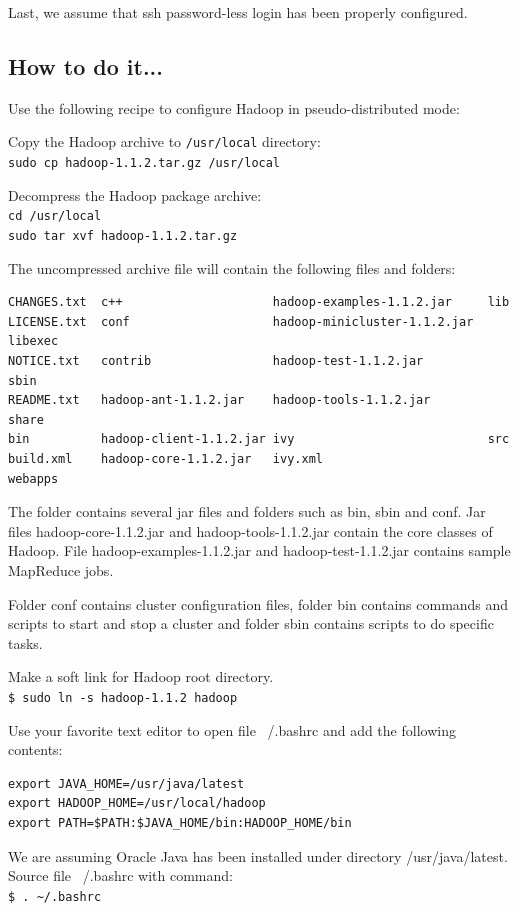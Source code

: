 Last, we assume that ssh password-less login has been properly configured.
\subsection*{How to do it...}
Use the following recipe to configure Hadoop in pseudo-distributed mode:

Copy the Hadoop archive to \verb|/usr/local| directory:\\
\verb|sudo cp hadoop-1.1.2.tar.gz /usr/local|

Decompress the Hadoop package archive: \\
\verb|cd /usr/local| \\
\verb|sudo tar xvf hadoop-1.1.2.tar.gz|

The uncompressed archive file will contain the following files and folders:
\lstset{style=bashstyle}
\begin{lstlisting}[caption=Content from the uncompressed Hadoop package.]
CHANGES.txt  c++                     hadoop-examples-1.1.2.jar     lib
LICENSE.txt  conf                    hadoop-minicluster-1.1.2.jar  libexec
NOTICE.txt   contrib                 hadoop-test-1.1.2.jar         sbin
README.txt   hadoop-ant-1.1.2.jar    hadoop-tools-1.1.2.jar        share
bin          hadoop-client-1.1.2.jar ivy                           src
build.xml    hadoop-core-1.1.2.jar   ivy.xml                       webapps
\end{lstlisting}
The folder contains several jar files and folders such as bin, sbin and conf. Jar files hadoop-core-1.1.2.jar and hadoop-tools-1.1.2.jar contain the core classes of Hadoop. File hadoop-examples-1.1.2.jar and hadoop-test-1.1.2.jar contains sample MapReduce jobs.

Folder conf contains cluster configuration files, folder bin contains commands and scripts to start and stop a cluster and folder sbin contains scripts to do specific tasks.

Make a soft link for Hadoop root directory. \\
\verb|$ sudo ln -s hadoop-1.1.2 hadoop|

Use your favorite text editor to open file ~/.bashrc and add the following contents: 
\begin{verbatim}
export JAVA_HOME=/usr/java/latest
export HADOOP_HOME=/usr/local/hadoop
export PATH=$PATH:$JAVA_HOME/bin:HADOOP_HOME/bin
\end{verbatim}

We are assuming Oracle Java has been installed under directory /usr/java/latest. \\
Source file ~/.bashrc with command: \\
\verb|$ . ~/.bashrc|

